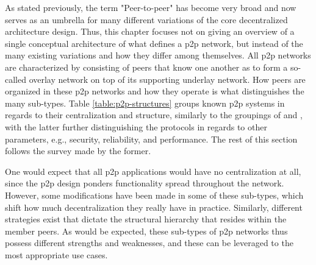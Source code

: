    As stated previously, the term "Peer-to-peer" has become very broad and now serves as an umbrella for many different variations of the core decentralized architecture design.
    Thus, this chapter focuses not on giving an overview of a single conceptual architecture of what defines a \gls{p2p} network, but instead of the many existing variations and how they differ among themselves.
    All \gls{p2p} networks are characterized by consisting of peers that know one another as to form a so-called overlay network on top of its supporting underlay network.
    How peers are organized in these \gls{p2p} networks and how they operate is what distinguishes the many sub-types.
    Table \ref{table:p2p-structures} groups known \gls{p2p} systems in regards to their centralization and structure, similarly to the groupings of \cite{p2p-survey-1} and \cite{p2p-survey-2}, with the latter further distinguishing the protocols in regards to other parameters, e.g., security, reliability, and performance.
    The rest of this section follows the survey made by the former.

    One would expect that all \gls{p2p} applications would have no centralization at all, since the \gls{p2p} design ponders functionality spread throughout the network.
    However, some modifications have been made in some of these sub-types, which shift how much decentralization they really have in practice.
    Similarly, different strategies exist that dictate the structural hierarchy that resides within the member peers.
    As would be expected, these sub-types of \gls{p2p} networks thus possess different strengths and weaknesses, and these can be leveraged to the most appropriate use cases.

